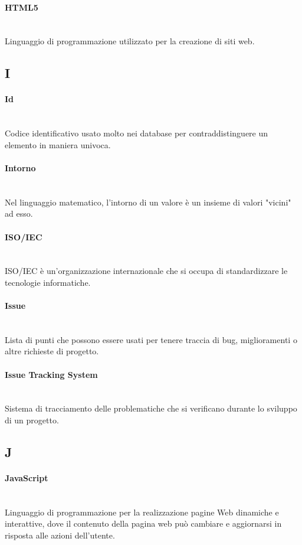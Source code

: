 \paragraph{HTML5}~\smallskip \\
Linguaggio di programmazione utilizzato per la creazione di siti web.
\newpage
{}
\subsection*{I}
\paragraph{Id}~\smallskip \\
Codice identificativo usato molto nei database per contraddistinguere un elemento in maniera univoca.

\paragraph{Intorno}~\smallskip \\
Nel linguaggio matematico, l'intorno di un valore è un insieme di valori "vicini" ad esso.

\paragraph{ISO/IEC}~\smallskip \\
ISO/IEC è un'organizzazione internazionale che si occupa di standardizzare le tecnologie informatiche.

\paragraph{Issue}~\smallskip \\
Lista di punti che possono essere usati per tenere traccia di bug, miglioramenti o altre richieste di progetto.

\paragraph{Issue Tracking System}~\smallskip \\
Sistema di tracciamento delle problematiche che si verificano durante lo sviluppo di un progetto.
\newpage
{}
\subsection*{J}
\paragraph{JavaScript}~\smallskip \\
Linguaggio di programmazione per la realizzazione pagine Web dinamiche e interattive, dove il contenuto della pagina web può cambiare e aggiornarsi in risposta alle azioni dell'utente.

